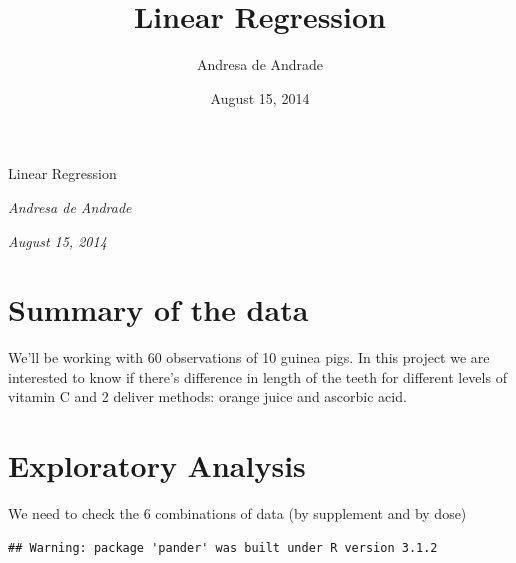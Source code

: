 \documentclass[]{article}
\title{Linear Regression}
\author{Andresa de Andrade}
\date{August 15, 2014}
\begin{document}
\begin{center}
\huge Linear Regression \\[0.2cm]
\end{center}
\begin{center}
\large \emph{Andresa de Andrade}\\[0.1cm]
\end{center}
\begin{center}
\large \emph{August 15, 2014} \\
\end{center}
\normalsize


{
\hypersetup{linkcolor=black}
\setcounter{tocdepth}{2}
\tableofcontents
}
\newpage 

\section{Summary of the data}\label{summary-of-the-data}

We'll be working with 60 observations of 10 guinea pigs. In this project
we are interested to know if there's difference in length of the teeth
for different levels of vitamin C and 2 deliver methods: orange juice
and ascorbic acid.

\section{Exploratory Analysis}\label{exploratory-analysis}

We need to check the 6 combinations of data (by supplement and by dose)

\begin{verbatim}
## Warning: package 'pander' was built under R version 3.1.2
\end{verbatim}
\end{document}
